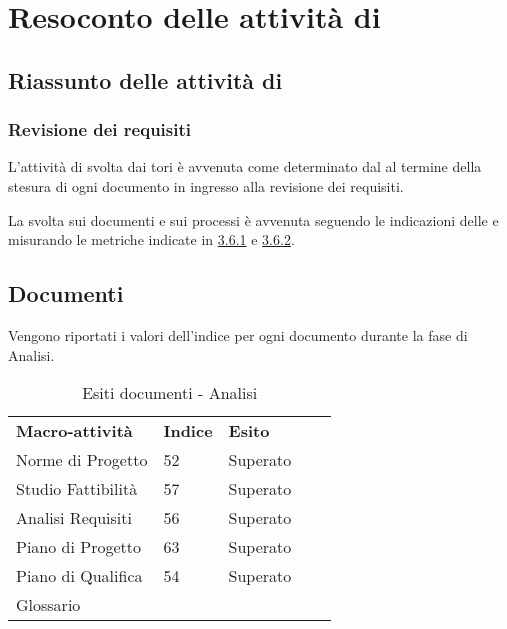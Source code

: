 \newpage
\section{Resoconto delle attività di } \label{App:AppendixA}
	\subsection{Riassunto delle attività di } \label{App:AppendixA}
		\subsubsection{Revisione dei requisiti} \label{App:AppendixA}
			
			L'attività di  svolta dai tori è avvenuta come determinato dal \PianoDiProgetto al termine della stesura di ogni documento in ingresso alla revisione dei requisiti.
			
			La  svolta sui documenti e sui processi è avvenuta seguendo le indicazioni delle \NormeDiProgetto e misurando le metriche indicate in \hyperlink{metriche_documenti}{3.6.1} e \hyperlink{metriche_processi}{3.6.2}.
\subsection{Documenti} \label{App:AppendixB}
	
		Vengono riportati i valori dell’indice  per ogni documento durante la fase di Analisi. 
		
		\begin{table}[!ht]
			\centering
				\begin{tabular}{|l|l|l|ll}
					\cline{1-3}
					 \textbf{Macro-attività}  & \textbf{Indice \glossaryItem{Gulpease}}  & \textbf{Esito}  &  \\ \cline{1-3}
					 Norme di Progetto  & 52 & Superato &  \\ \cline{1-3}
					 Studio Fattibilità & 57 & Superato &  \\ \cline{1-3}
					 Analisi Requisiti & 56 & Superato &  \\ \cline{1-3}
					 Piano di Progetto & 63 & Superato &  \\ \cline{1-3}
					 Piano di Qualifica & 54 & Superato &  \\ \cline{1-3}
					 Glossario &  &  &  \\ \cline{1-3}
				\end{tabular}
				\caption{Esiti  documenti - Analisi}
		\end{table}
